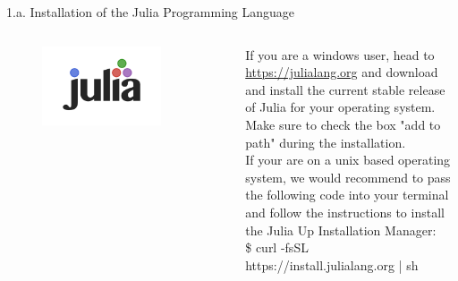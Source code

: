 \documentclass[aspectratio=1610,12pt]{beamer}
\begin{document}
\begin{frame}[fragile]{1.a. Installation of the Julia Programming Language}
	\begin{columns}[onlytextwidth]
    	\center
    		\begin{figure}
    			\includegraphics[width=0.8\textwidth]{images/julia-programming-language.png}
       		\end{figure}
    		If you are a windows user, head to  \url{https://julialang.org} and download and install the current stable release of Julia for your operating system. Make sure to check the box "add to path" during the installation.\\
    		\vspace{0.2cm}
    		If your are on a unix based operating system, we would recommend to pass the following code into your terminal and follow the instructions to install the Julia Up Installation Manager:\\
    		\vspace{0.1cm}
    		\$ curl -fsSL https://install.julialang.org | sh	
    \end{columns}
\end{frame}
\end{document}

